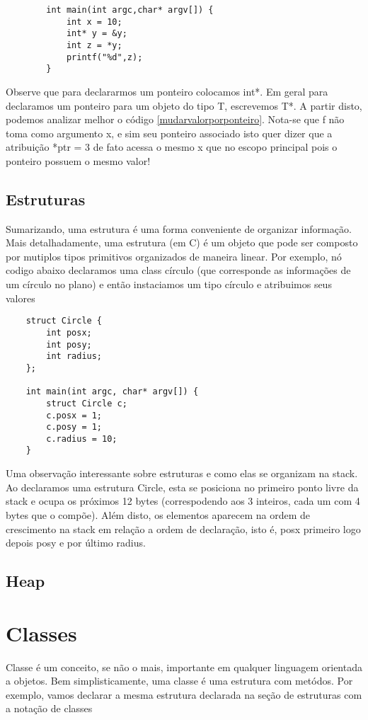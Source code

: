 \documentclass{amsbook}
\begin{document}
{{{{{{\begin{lstlisting}
		int main(int argc,char* argv[]) {
			int x = 10;
			int* y = &y;
			int z = *y;
			printf("%d",z);
		}
	\end{lstlisting}

	Observe que para declararmos um ponteiro colocamos int*. Em geral para declaramos um ponteiro para um objeto do tipo T, escrevemos T*. A partir disto, podemos analizar melhor o código \ref{mudarvalorporponteiro}. Nota-se que f não toma como argumento x, e sim seu ponteiro associado isto quer dizer que a atribuição *ptr = 3 de fato acessa o mesmo x que no escopo principal pois o ponteiro possuem o mesmo valor!



\section{Estruturas}
	Sumarizando, uma estrutura é uma forma conveniente de organizar informação. Mais detalhadamente, uma estrutura (em C) é um objeto que pode ser composto por mutiplos tipos primitivos organizados de maneira linear. Por exemplo, nó codigo abaixo declaramos uma class círculo (que corresponde as informações de um círculo no plano) e então instaciamos um tipo círculo e atribuimos seus valores
	\begin{lstlisting}
	struct Circle {
		int posx;
		int posy;
		int radius;
	};

	int main(int argc, char* argv[]) {
		struct Circle c;
		c.posx = 1;
		c.posy = 1;
		c.radius = 10;
	}
	\end{lstlisting}

	Uma observação interessante sobre estruturas e como elas se organizam na stack. Ao declaramos uma estrutura Circle, esta se posiciona no primeiro ponto livre da stack e ocupa os próximos 12 bytes (correspodendo aos 3 inteiros, cada um com 4 bytes que o compõe). Além disto, os elementos aparecem na ordem de crescimento na stack em relação a ordem de declaração, isto é, posx primeiro logo depois posy e por último radius.

	\section{Heap}


\chapter{Classes} 
	Classe é um conceito, se não o mais, importante em qualquer linguagem orientada a objetos. Bem simplisticamente, uma classe é uma estrutura com metódos. Por exemplo, vamos declarar a mesma estrutura declarada na seção de estruturas com a notação de classes

}}}}}}
\end{document}
